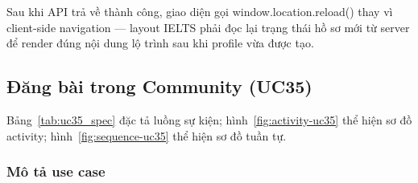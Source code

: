 Sau khi API trả về thành công, giao diện gọi window.location.reload() thay vì client-side navigation --- layout IELTS phải đọc lại trạng thái hồ sơ mới từ server để render đúng nội dung lộ trình sau khi profile vừa được tạo.

\subsection{Đăng bài trong Community (UC35)}
Bảng~\ref{tab:uc35_spec} đặc tả luồng sự kiện; hình~\ref{fig:activity-uc35} thể hiện sơ đồ activity; hình~\ref{fig:sequence-uc35} thể hiện sơ đồ tuần tự.
\subsubsection{Mô tả use case}
\renewcommand{\arraystretch}{1.3}
\setlength{\tbu}{\dimexpr(\linewidth - 4\tabcolsep - 3\arrayrulewidth)/2\relax}
